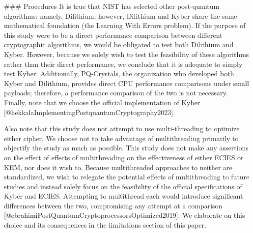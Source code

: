 \documentclass[12pt]{article}
\begin{document}
### Procedures
It is true that NIST has selected other post-quantum algorithms: namely, Dilithium; however, Dilithium and Kyber share the same mathematical foundation (the Learning With Errors problem). If the purpose of this study were to be a direct performance comparison between different cryptographic algorithms, we would be obligated to test both Dilithium and Kyber. However, because we solely wish to test the feasibility of these algorithms rather than their direct performance, we conclude that it is adequate to simply test Kyber. Additionally, PQ-Crystals, the organization who developed both Kyber and Dilithium, provides direct CPU performance comparisons under small payloads; therefore, a performance comparison of the two is not necessary. Finally, note that we choose the official implementation of Kyber [@hekkalaImplementingPostquantumCryptography2023]. 

Also note that this study does not attempt to use multi-threading to optimize either cipher. We choose not to take advantage of multithreading primarily to objectify the study as much as possible. This study does not make any assertions on the effect of effects of multithreading on the effectiveness of either ECIES or KEM, nor does it wish to. Because multithreaded approaches to neither are standardized, we wish to relegate the potential effects of multithreading to future studies and instead solely focus on the feasibility of the official specifications of Kyber and ECIES. Attempting to multithread each would introduce significant differences between the two, compromising any attempt at a comparison [@ebrahimiPostQuantumCryptoprocessorsOptimized2019]. We elaborate on this choice and its consequences in the limitations section of this paper. 
\end{document}
